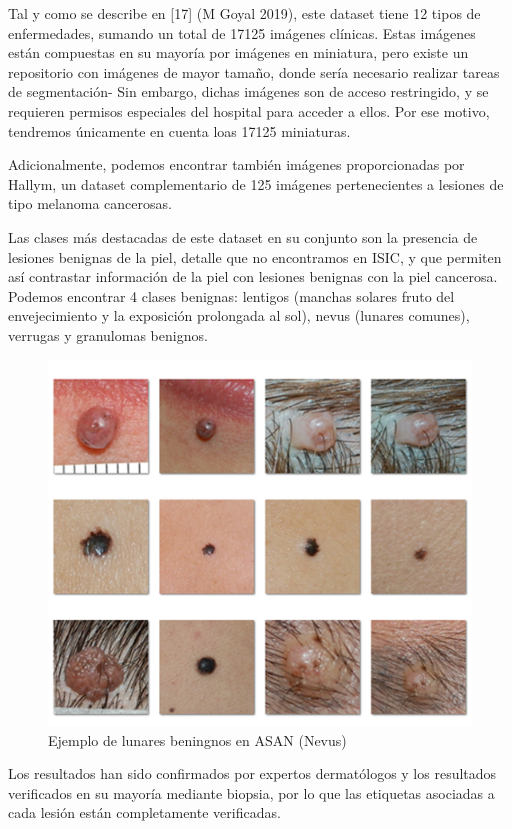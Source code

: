 Tal y como se describe en [17] (M Goyal 2019), este dataset tiene 12 tipos de enfermedades, sumando un total de 17125 imágenes clínicas. Estas imágenes están compuestas en su mayoría por imágenes en miniatura, pero existe un repositorio con imágenes de mayor tamaño, donde sería necesario realizar tareas de segmentación- Sin embargo, dichas imágenes son de acceso restringido, y se requieren permisos especiales del hospital para acceder a ellos. Por ese motivo, tendremos únicamente en cuenta loas 17125 miniaturas.

Adicionalmente, podemos encontrar también imágenes proporcionadas por Hallym, un dataset complementario de 125 imágenes pertenecientes a lesiones de tipo melanoma cancerosas.

Las clases más destacadas de este dataset en su conjunto son la presencia de lesiones benignas de la piel, detalle que no encontramos en ISIC, y que permiten así contrastar información de la piel con lesiones benignas con la piel cancerosa. Podemos encontrar 4 clases benignas: lentigos (manchas solares fruto del envejecimiento y la exposición prolongada al sol), nevus (lunares comunes), verrugas y granulomas benignos. 

\begin{figure}[H]
	\centering
	\includegraphics[scale = 0.6]{imagenes/ASAN.png}
	\caption{Ejemplo de lunares beningnos en ASAN (Nevus)}
\end{figure}

Los resultados han sido confirmados por expertos dermatólogos y los resultados verificados en su mayoría mediante biopsia, por lo que las etiquetas asociadas a cada lesión están completamente verificadas.\\

